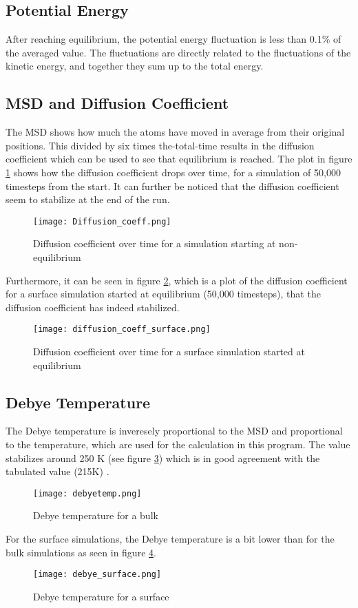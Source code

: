 \subsection{Potential Energy}
After reaching equilibrium, the potential energy fluctuation is less than 0.1\% of the averaged value. The fluctuations are directly related to the fluctuations of the kinetic energy, and together they sum up to the total energy.

\subsection{MSD and Diffusion Coefficient}
The MSD shows how much the atoms have moved in average from their original positions. This divided by six times the-total-time results in the diffusion coefficient which can be used to see that equilibrium is reached. The plot in figure \ref{fig:Diffusion_coeff} shows how the diffusion coefficient drops over time, for a simulation of 50,000 timesteps from the start. It can further be noticed that the diffusion coefficient seem to stabilize at the end of the run. 
\begin{figure}[ht]
	\centering
	\texttt{[image: Diffusion\_coeff.png]}
	\caption{Diffusion coefficient over time for a simulation starting at non-equilibrium}
	\label{fig:Diffusion_coeff}
\end{figure}
Furthermore, it can be seen in figure \ref{fig:diffusion_coeff_surface}, which is a plot of the diffusion coefficient for a surface simulation started at equilibrium (50,000 timesteps), that the diffusion coefficient has indeed stabilized.
\begin{figure}[ht]
	\centering
	\texttt{[image: diffusion\_coeff\_surface.png]}
	\caption{Diffusion coefficient over time for a surface simulation started at equilibrium}
	\label{fig:diffusion_coeff_surface}
\end{figure}

\subsection{Debye Temperature}
The Debye temperature is inveresely proportional to the MSD and proportional to the temperature, which are used for the calculation in this program.
The value stabilizes around 250 K (see figure \ref{fig:debyetemp}) which is in good agreement with the tabulated value (215K) \cite{bib:DebyeSilver}.
\begin{figure}[ht]
	\centering
	\texttt{[image: debyetemp.png]}
	\caption{Debye temperature for a bulk}
	\label{fig:debyetemp}
\end{figure}
For the surface simulations, the Debye temperature is a bit lower than for the bulk simulations as seen in figure \ref{fig:debye_surface}.
\begin{figure}[ht]
	\centering
	\texttt{[image: debye\_surface.png]}
	\caption{Debye temperature for a surface}
	\label{fig:debye_surface}
\end{figure}

